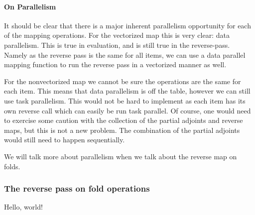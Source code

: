             \paragraph*{On Parallelism}
                It should be clear that there is a major inherent parallelism opportunity for each of the mapping operations.
                For the vectorized map this is very clear: data parallelism.
                This is true in evaluation, and is still true in the reverse-pass.
                Namely as the reverse pass is the same for all items, we can use a data parallel mapping function to run the reverse pass in a vectorized manner as well.

                For the nonvectorized map we cannot be sure the operations are the same for each item.
                This means that data parallelism is off the table, however we can still use task parallelism.
                This would not be hard to implement as each item has its own reverse call which can easily be run task parallel.
                Of course, one would need to exercise some caution with the collection of the partial adjoints and reverse maps, but this is not a new problem.
                The combination of the partial adjoints would still need to happen sequentially.

                We will talk more about parallelism when we talk about the reverse map on folds.

        \subsubsection{The reverse pass on fold operations}
            Hello, world!

